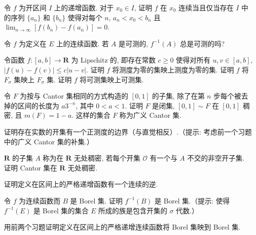 \documentclass[../../main.tex]{subfiles}
\begin{document}
\begin{exercise}\label{exercise:ch02-35}
令 $f$ 为开区间 $I$ 上的递增函数. 对于 $x_{0}\in I$, 证明 $f$ 在 $x_{0}$ 连续当且仅当存在 $I$ 中的序列 $\{a_{n}\}$ 和 $\{b_{n}\}$ 使得对每个 $n$, $a_{n}<x_{0}<b_{n}$ 且 $\lim_{n\to\infty}[f(b_{n})-f(a_{n})]=0$.
\end{exercise}

\begin{exercise}\label{exercise:ch02-36}
令 $f$ 为定义在 $E$ 上的连续函数. 若 $A$ 是可测的, $f^{-1}(A)$ 总是可测的吗?
\end{exercise}

\begin{exercise}\label{exercise:ch02-37}
令函数 $f:[a,b]\to\mathbf{R}$ 为 Lipschitz 的, 即存在常数 $c\geqslant 0$ 使得对所有 $u,v\in[a,b]$, $|f(u)-f(v)|\leqslant c|u-v|$. 证明 $f$ 将测度为零的集映上测度为零的集. 证明 $f$ 将 $F_{\sigma}$ 集映上 $F_{\sigma}$ 集. 证明 $f$ 将可测集映上可测集.
\end{exercise}

\begin{exercise}\label{exercise:ch02-38}
令 $F$ 为按与 Cantor 集相同的方式构造的 $[0,1]$ 的子集, 除了在第 $n$ 步每个被去掉的区间的长度为 $a3^{-n}$, 其中 $0<a<1$. 证明 $F$ 是闭集, $[0,1]\sim F$ 在 $[0,1]$ 稠密, 且 $m(F)=1-a$. 这样的集合 $F$ 称为广义 Cantor 集.
\end{exercise}

\begin{exercise}\label{exercise:ch02-39}
证明存在实数的开集有一个正测度的边界（与直觉相反）.（提示: 考虑前一个习题中的广义 Cantor 集的补集.）
\end{exercise}

\begin{exercise}\label{exercise:ch02-40}
$\mathbf{R}$ 的子集 $A$ 称为在 $\mathbf{R}$ 无处稠密, 若每个开集 $\mathcal{O}$ 有一个与 $A$ 不交的非空开子集. 证明 Cantor 集在 $\mathbf{R}$ 无处稠密.
\end{exercise}

\begin{exercise}\label{exercise:ch02-41}
证明定义在区间上的严格递增函数有一个连续的逆.
\end{exercise}

\begin{exercise}\label{exercise:ch02-42}
令 $f$ 为连续函数而 $B$ 是 Borel 集. 证明 $f^{-1}(B)$ 是 Borel 集.（提示: 使得 $f^{-1}(E)$ 是 Borel 集的集合 $E$ 所成的族是包含开集的 $\sigma$ 代数.）
\end{exercise}

\begin{exercise}\label{exercise:ch02-43}
用前两个习题证明定义在区间上的严格递增连续函数将 Borel 集映到 Borel 集.
\end{exercise}
\end{document}
